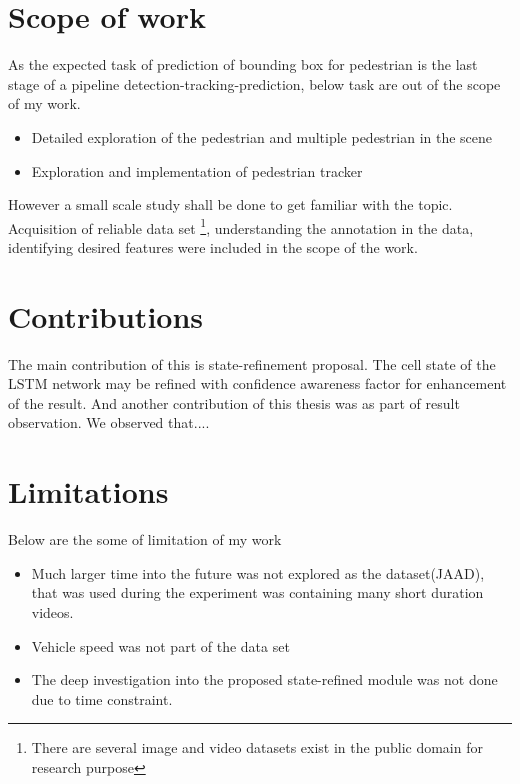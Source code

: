 \section{Scope of work}
As the expected task of prediction of bounding box for pedestrian is the last stage of a pipeline detection-tracking-prediction, below task are out of the scope of my work.
\begin{itemize}
	\item Detailed exploration of the pedestrian and multiple pedestrian in the scene
	\item Exploration and implementation of pedestrian tracker
\end{itemize}
However a small scale study shall be done to get familiar with the topic.  Acquisition of reliable data set \footnote{There are several image and video datasets exist in the public domain for research purpose}, understanding the annotation in the data, identifying desired features were included in the scope of the work.

\section{Contributions}
The main contribution of this is state-refinement proposal. The cell state of the LSTM network may be refined with confidence awareness factor for enhancement of the result. And another contribution of this thesis was as part of result observation. We observed that....

\section{Limitations}
Below are the some of limitation of my work
\begin{itemize}
	\item Much larger time into the future was not explored as the dataset(JAAD), that was used during the experiment was containing many short duration videos. 

	\item Vehicle speed was not part of the data set
	\item The deep investigation into the proposed state-refined module was not done due to time constraint.
\end{itemize}

